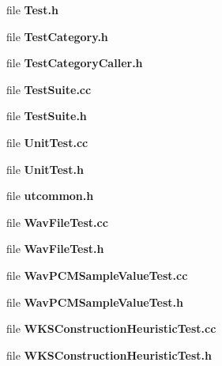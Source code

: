 \begin{DoxyCompactItemize}
file \textbf{ Test.\+h}
\item 
file \textbf{ Test\+Category.\+h}
\item 
file \textbf{ Test\+Category\+Caller.\+h}
\item 
file \textbf{ Test\+Suite.\+cc}
\item 
file \textbf{ Test\+Suite.\+h}
\item 
file \textbf{ Unit\+Test.\+cc}
\item 
file \textbf{ Unit\+Test.\+h}
\item 
file \textbf{ utcommon.\+h}
\item 
file \textbf{ Wav\+File\+Test.\+cc}
\item 
file \textbf{ Wav\+File\+Test.\+h}
\item 
file \textbf{ Wav\+P\+C\+M\+Sample\+Value\+Test.\+cc}
\item 
file \textbf{ Wav\+P\+C\+M\+Sample\+Value\+Test.\+h}
\item 
file \textbf{ W\+K\+S\+Construction\+Heuristic\+Test.\+cc}
\item 
file \textbf{ W\+K\+S\+Construction\+Heuristic\+Test.\+h}
\end{DoxyCompactItemize}
